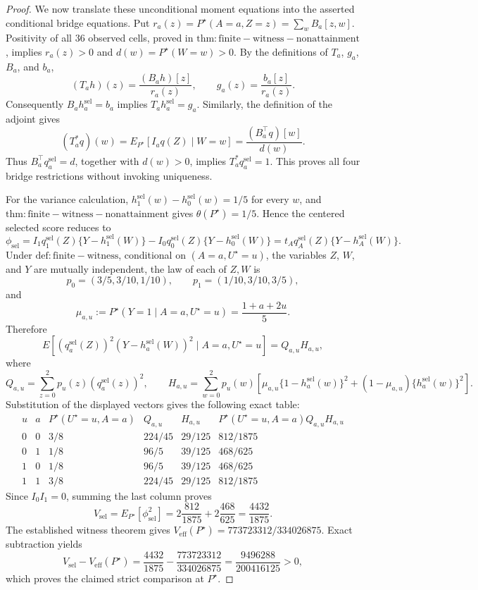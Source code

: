 \documentclass{article}
\begin{document}
\begin{proof}
We now translate these unconditional moment equations into the asserted conditional bridge equations.  Put
\(r_a(z)=P^\star(A=a,Z=z)=\sum_wB_a[z,w]\).  Positivity of all \(36\) observed cells, proved in \(\mathrm{thm:finite-witness-nonattainment}\), implies \(r_a(z)>0\) and \(d(w)=P^\star(W=w)>0\).  By the definitions of \(T_a\), \(g_a\), \(B_a\), and \(b_a\),
\[
(T_ah)(z)=\frac{(B_ah)[z]}{r_a(z)},
\qquad
g_a(z)=\frac{b_a[z]}{r_a(z)}.
\]
Consequently \(B_ah_a^{\mathrm{sel}}=b_a\) implies
\(T_ah_a^{\mathrm{sel}}=g_a\).  Similarly, the definition of the adjoint gives
\[
(T_a^*q)(w)
=E_{P^\star}[I_aq(Z)\mid W=w]
=\frac{(B_a^\top q)[w]}{d(w)}.
\]
Thus \(B_a^\top q_a^{\mathrm{sel}}=d\), together with \(d(w)>0\), implies
\(T_a^*q_a^{\mathrm{sel}}=1\).  This proves all four bridge restrictions without invoking uniqueness.

For the variance calculation, \(h_1^{\mathrm{sel}}(w)-h_0^{\mathrm{sel}}(w)=1/5\) for every \(w\), and \(\mathrm{thm:finite-witness-nonattainment}\) gives \(\theta(P^\star)=1/5\).  Hence the centered selected score reduces to
\[
\phi_{\mathrm{sel}}
=I_1q_1^{\mathrm{sel}}(Z)\{Y-h_1^{\mathrm{sel}}(W)\}
-I_0q_0^{\mathrm{sel}}(Z)\{Y-h_0^{\mathrm{sel}}(W)\}
=t_Aq_A^{\mathrm{sel}}(Z)\{Y-h_A^{\mathrm{sel}}(W)\}.
\]
Under \(\mathrm{def:finite-witness}\), conditional on \((A=a,U^\star=u)\), the variables \(Z\), \(W\), and \(Y\) are mutually independent, the law of each of \(Z,W\) is
\[
p_0=(3/5,3/10,1/10),\qquad p_1=(1/10,3/10,3/5),
\]
and
\[
\mu_{a,u}:=P^\star(Y=1\mid A=a,U^\star=u)=\frac{1+a+2u}{5}.
\]
Therefore
\[
E[(q_a^{\mathrm{sel}}(Z))^2(Y-h_a^{\mathrm{sel}}(W))^2\mid A=a,U^\star=u]
=Q_{a,u}H_{a,u},
\]
where
\[
Q_{a,u}=\sum_{z=0}^2p_u(z)(q_a^{\mathrm{sel}}(z))^2,
\qquad
H_{a,u}=\sum_{w=0}^2p_u(w)
\left[\mu_{a,u}\{1-h_a^{\mathrm{sel}}(w)\}^2
+(1-\mu_{a,u})\{h_a^{\mathrm{sel}}(w)\}^2\right].
\]
Substitution of the displayed vectors gives the following exact table:
\[
\begin{array}{c|c|c|c|c|c}
u&a&P^\star(U^\star=u,A=a)&Q_{a,u}&H_{a,u}&P^\star(U^\star=u,A=a)Q_{a,u}H_{a,u}\\ \hline
0&0&3/8&224/45&29/125&812/1875\\
0&1&1/8&96/5&39/125&468/625\\
1&0&1/8&96/5&39/125&468/625\\
1&1&3/8&224/45&29/125&812/1875
\end{array}
\]
Since \(I_0I_1=0\), summing the last column proves
\[
V_{\mathrm{sel}}
=E_{P^\star}[\phi_{\mathrm{sel}}^2]
=2\frac{812}{1875}+2\frac{468}{625}
=\frac{4432}{1875}.
\]
The established witness theorem gives
\(V_{\mathrm{eff}}(P^\star)=773723312/334026875\).  Exact subtraction yields
\[
V_{\mathrm{sel}}-V_{\mathrm{eff}}(P^\star)
=\frac{4432}{1875}-\frac{773723312}{334026875}
=\frac{9496288}{200416125}>0,
\]
which proves the claimed strict comparison at \(P^\star\).


\end{proof}
\end{document}
